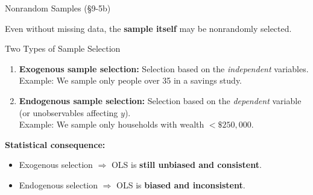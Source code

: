\documentclass[aspectratio=169, 12pt]{beamer}
\begin{document}
\begin{frame}[shrink=10]{Nonrandom Samples (\S9-5b)}

  Even without missing data, the \textbf{sample itself} may be nonrandomly selected.

  \begin{definitionbox}{Two Types of Sample Selection}
    \begin{enumerate}\setlength{\itemsep}{2pt}
      \item \textbf{Exogenous sample selection:} Selection based on the \emph{independent}
      variables.
      \\ Example: We sample only people over 35 in a savings study.

      \item \textbf{Endogenous sample selection:} Selection based on the \emph{dependent}
      variable (or unobservables affecting $y$).
      \\ Example: We sample only households with wealth $< \$250{,}000$.
    \end{enumerate}
  \end{definitionbox}

  \begin{highlightbox}
    \textbf{Statistical consequence:}
    \begin{itemize}\setlength{\itemsep}{1pt}
      \item Exogenous selection $\Rightarrow$ OLS is \textbf{still unbiased and consistent}.
      \item Endogenous selection $\Rightarrow$ OLS is \textbf{biased and inconsistent}.
    \end{itemize}
  \end{highlightbox}

\end{frame}
\end{document}
